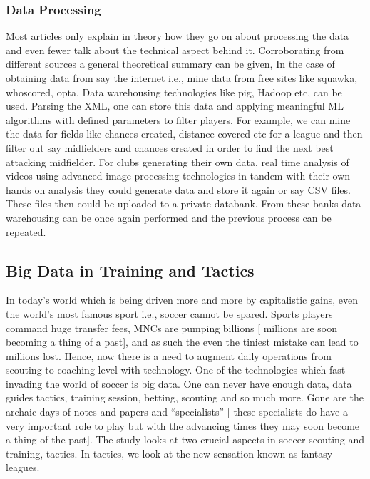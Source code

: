 \documentclass[sigconf]{acmart}
\begin{document}
\subsubsection{Data Processing}

Most articles only explain in theory how they go on about processing the data and even fewer talk about the technical aspect behind it. Corroborating from different sources \cite{Rein2016}\cite{Luca20000}\cite{Outsideoftheboot2000} a general theoretical summary can be given, In the case of obtaining data from say the internet i.e., mine data from free sites like squawka, whoscored, opta. Data warehousing technologies like pig, Hadoop etc, can be used. Parsing the XML, one can store this data and applying meaningful ML algorithms with defined parameters to filter players. For example, we can mine the data for fields like chances created, distance covered etc for a league and then filter out say midfielders and chances created in order to find the next best attacking midfielder.\newline
For clubs generating their own data, real time analysis of videos using advanced image processing technologies in tandem with their own hands on analysis they could generate data and store it again or say CSV files. These files then could be uploaded to a private databank. From these banks data warehousing can be once again performed and the previous process can be repeated.


\subsection{Big Data in Training and Tactics}

In today’s world which is being driven more and more by capitalistic gains, even the world’s most famous sport i.e., soccer cannot be spared. Sports players command huge transfer fees, MNCs are pumping billions [ millions are soon becoming a thing of a past]\cite{cooling}, and as such the even the tiniest mistake can lead to millions lost. Hence, now there is a need to augment daily operations from scouting to coaching level with technology. One of the technologies which fast invading the world of soccer is big data. One can never have enough data, data guides tactics, training session, betting, scouting and so much more. Gone are the archaic days of notes and papers and “specialists” [ these specialists do have a very important role to play but with the advancing times they may soon become a thing of the past]. The study looks at two crucial aspects in soccer scouting and training, tactics. In tactics, we look at the new sensation known as fantasy leagues.
\end{document}
